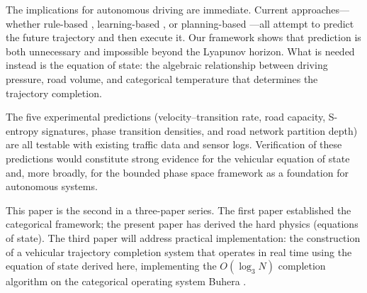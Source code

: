 \documentclass[twocolumn,10pt]{article}
\begin{document}
The implications for autonomous driving are immediate. Current approaches---whether rule-based \cite{urmson2008}, learning-based \cite{bojarski2016, bansal2019}, or planning-based \cite{schwarting2018}---all attempt to predict the future trajectory and then execute it. Our framework shows that prediction is both unnecessary and impossible beyond the Lyapunov horizon. What is needed instead is the equation of state: the algebraic relationship between driving pressure, road volume, and categorical temperature that determines the trajectory completion.

The five experimental predictions (velocity--transition rate, road capacity, S-entropy signatures, phase transition densities, and road network partition depth) are all testable with existing traffic data and sensor logs. Verification of these predictions would constitute strong evidence for the vehicular equation of state and, more broadly, for the bounded phase space framework as a foundation for autonomous systems.

This paper is the second in a three-paper series. The first paper \cite{sachikonye2026trajectory} established the categorical framework; the present paper has derived the hard physics (equations of state). The third paper will address practical implementation: the construction of a vehicular trajectory completion system that operates in real time using the equation of state derived here, implementing the $O(\log_3 N)$ completion algorithm on the categorical operating system Buhera \cite{sachikonye2026buhera}.




\end{document}
